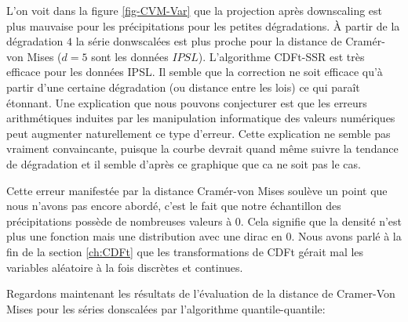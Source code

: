 \documentclass[a4paper,11pt]{article}
\numberwithin{equation}{section}
\begin{document}
L'on voit dans la figure \ref{fig-CVM-Var} que la projection après downscaling est plus mauvaise pour les précipitations pour les petites dégradations. À partir de la dégradation $4$ la série donwscalées est plus proche pour la distance de Cramér-von Mises ($d=5$ sont les données $IPSL$). L'algorithme CDFt-SSR est très efficace pour les données IPSL. Il semble que la correction ne soit efficace qu'à partir d'une certaine dégradation (ou distance entre les lois) ce qui paraît étonnant. Une explication que nous pouvons conjecturer est que les erreurs arithmétiques induites par les manipulation informatique des valeurs numériques peut augmenter naturellement ce type d'erreur. Cette explication ne semble pas vraiment convaincante, puisque la courbe devrait quand même suivre la tendance de dégradation et il semble d'après ce graphique que ca ne soit pas le cas.

Cette erreur manifestée par la distance Cramér-von Mises soulève un point que nous n'avons pas encore abordé, c'est le fait que notre échantillon des précipitations possède de nombreuses valeurs à $0$. Cela signifie que la densité n'est plus une fonction mais une distribution avec une dirac en $0$. Nous avons parlé à la fin de la section \ref{ch:CDFt} que les transformations de CDFt gérait mal les variables aléatoire à la fois discrètes et continues.

Regardons maintenant les résultats de l'évaluation de la distance de Cramer-Von Mises pour les séries donscalées par l'algorithme quantile-quantile:
\end{document}
